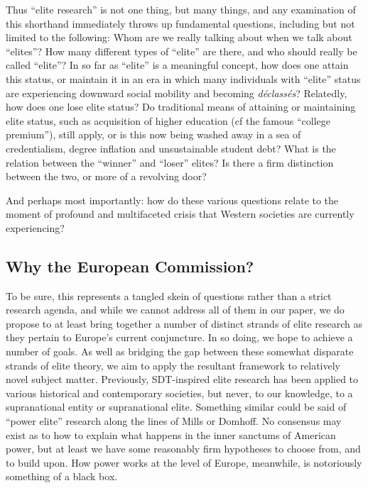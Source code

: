 \documentclass[11pt,a4paper]{article}
\begin{document}
Thus ``elite research'' is not one thing, but many things, and any examination of this shorthand immediately throws up fundamental questions, including but not limited to the following: Whom are we really talking about when we talk about ``elites''? How many different types of ``elite'' are there, and who should really be called ``elite''? In so far as ``elite'' is a meaningful concept, how does one attain this status, or maintain it in an era in which many individuals with ``elite'' status are experiencing downward social mobility and becoming \emph{d\'eclass\'es}? Relatedly, how does one lose elite status? Do traditional means of attaining or maintaining elite status, such as acquisition of higher education (cf the famous ``college premium''), still apply, or is this now being washed away in a sea of credentialism, degree inflation and unsustainable student debt? What is the relation between the ``winner'' and ``loser'' elites? Is there a firm distinction between the two, or more of a revolving door?

And perhaps most importantly: how do these various questions relate to the moment of profound and multifaceted crisis that Western societies are currently experiencing?

\subsection{Why the European Commission?}

To be sure, this represents a tangled skein of questions rather than a strict research agenda, and while we cannot address all of them in our paper, we do propose to at least bring together a number of distinct strands of elite research as they pertain to Europe's current conjuncture. In so doing, we hope to achieve a number of goals. As well as bridging the gap between these somewhat disparate strands of elite theory, we aim to apply the resultant framework to relatively novel subject matter. Previously, SDT-inspired elite research has been applied to various historical and contemporary societies, but never, to our knowledge, to a supranational entity or supranational elite. Something similar could be said of ``power elite'' research along the lines of Mills or Domhoff. No consensus may exist as to how to explain what happens in the inner sanctums of American power, but at least we have some reasonably firm hypotheses to choose from, and to build upon. How power works at the level of Europe, meanwhile, is notoriously something of a black box.
\end{document}
